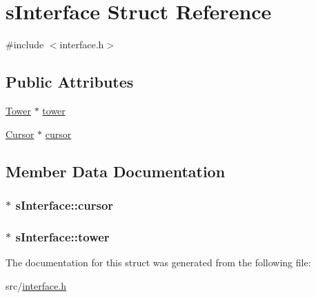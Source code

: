 \hypertarget{structs_interface}{\section{s\-Interface Struct Reference}
\label{structs_interface}
}


{\ttfamily \#include $<$interface.\-h$>$}

\subsection*{Public Attributes}
\begin{DoxyCompactItemize}
\item 
\hyperlink{tower_8h_a5070e945849fb8f0b9f8e9049b7434ba}{Tower} $\ast$ \hyperlink{structs_interface_a0cc8cc4aba1cc271d3741d832504d202}{tower}
\item 
\hyperlink{interface_8h_a2cc6eac3d76a3bead2da75d8bcd3ef05}{Cursor} $\ast$ \hyperlink{structs_interface_a8acbf9a94800605031c055fc69b53d26}{cursor}
\end{DoxyCompactItemize}


\subsection{Member Data Documentation}
\hypertarget{structs_interface_a8acbf9a94800605031c055fc69b53d26}{
\subsubsection[{cursor}]{$\ast$ s\-Interface\-::cursor}}\label{structs_interface_a8acbf9a94800605031c055fc69b53d26}
\hypertarget{structs_interface_a0cc8cc4aba1cc271d3741d832504d202}{
\subsubsection[{tower}]{$\ast$ s\-Interface\-::tower}}\label{structs_interface_a0cc8cc4aba1cc271d3741d832504d202}


The documentation for this struct was generated from the following file\-:\begin{DoxyCompactItemize}
\item 
src/\hyperlink{interface_8h}{interface.\-h}\end{DoxyCompactItemize}
